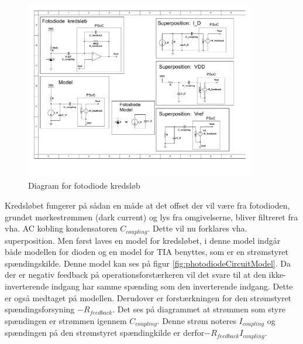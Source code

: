 \documentclass[HardwareDesign/HardwareDesign_main.tex]{subfiles}
\begin{document}
\begin{figure}[H]
    \centering
    \includegraphics[width=0.9\textwidth,trim={0.6in 5.1in 6.0in 0.55in},clip, page=1]{HardwareDesign/CupSensor/graphics/Superposition.pdf}
    \caption{Diagram for fotodiode kredsløb}
    \label{fig:photodiodeCircuit}
\end{figure}

Kredsløbet fungerer på sådan en måde at det offset der vil være fra fotodioden, grundet mørkestrømmen (dark current) og lys fra omgivelserne, bliver filtreret fra vha. AC kobling kondensatoren $C_{coupling}$. Dette vil nu forklares vha. superposition. Men først laves en model for kredsløbet, i denne model indgår både modellen for dioden og en model for TIA benyttes, som er en strømstyret spændingskilde. Denne model kan ses på figur \ref{fig:photodiodeCircuitModel}. 
Da der er negativ feedback på operationsforstærkeren vil det svare til at den ikke-inverterende indgang har samme spænding som den inverterende indgang. Dette er også medtaget på modellen. Derudover er forstærkningen for den strømstyret spændingsforsyning $-R_{feedback}$. Det ses på diagrammet at strømmen som styre spændingen er strømmen igennem $C_{coupling}$. Denne strøm noteres $I_{coupling}$ og spændingen på den strømstyret spændingkilde er derfor$-R_{feedback} I_{coupling}$.
\end{document}
